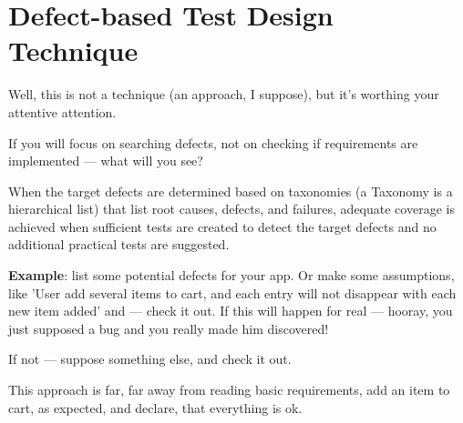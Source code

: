 \section{Defect-based Test Design Technique}
\label{sec:Defect-based Test Design Technique}

Well, this is not a technique (an approach, I suppose), but it's worthing your attentive attention.

If you will focus on searching defects, not on checking if requirements are implemented — what will you see?

When the target defects are determined based on taxonomies (a Taxonomy is a hierarchical list) that list root causes, defects, and failures, adequate coverage is achieved when sufficient tests are created to detect the target defects and no additional practical tests are suggested.

\textbf{Example}: list some potential defects for your app. Or make some assumptions, like 'User add several items to cart, and each entry will not disappear with each new item added' and — check it out. If this will happen for real — hooray, you just supposed a bug and you really made him discovered! 

If not — suppose something else, and check it out.

This approach is far, far away from reading basic requirements, add an item to cart, as expected, and declare, that everything is ok.